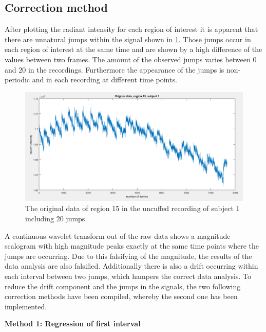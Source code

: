 \subsection{Correction method}

After plotting the radiant intensity for each region of interest it is apparent that there are unnatural jumps within the signal shown in \ref{fig:raw15}. Those jumps occur in each region of interest at the same time and are shown by a high difference of the values between two frames. The amount of the observed jumps varies between 0 and 20 in the recordings. Furthermore the appearance of the jumps is non-periodic and in each recording at different time points.
\begin{figure}[H]
	\includegraphics[width=1\textwidth]{figures/raw15}
	\caption{The original data of region 15 in the uncuffed recording of subject 1 including 20 jumps.}
	\label{fig:raw15}
\end{figure}
A continuous wavelet transform out of the raw data shows a magnitude scalogram with high magnitude peaks exactly at the same time points where the jumps are occurring. Due to this falsifying of the magnitude, the results of the data analysis are also falsified.
Additionally there is also a drift occurring within each interval between two jumps, which hampers the correct data analysis. To reduce the drift component and the jumps in the signals, the two following correction methods have been compiled, whereby the second one has been implemented.

\textbf{Method 1: Regression of first interval}

